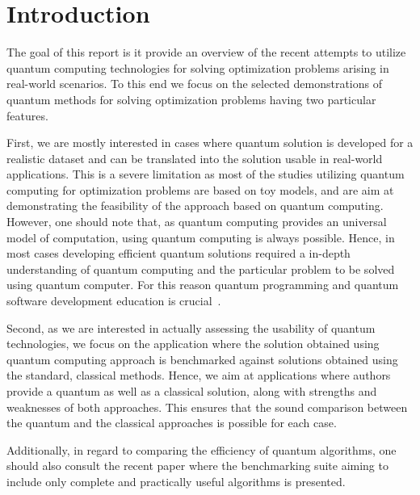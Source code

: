 \documentclass[a4paper,11pt]{article}
\newcommand{\docName}{report\xspace}
\begin{document}

%


\section{Introduction}

The goal of this \docName is it provide an overview of the recent attempts to utilize quantum computing technologies for solving optimization problems arising in real-world scenarios. To this end we focus on the selected demonstrations of quantum methods for solving optimization problems having two particular features.

First, we are mostly interested in cases where quantum solution is developed for a realistic dataset and can be translated into the solution usable in real-world applications. This is a severe limitation as most of the studies utilizing quantum computing for optimization problems are based on toy models, and are aim at demonstrating the feasibility of the approach based on quantum computing. However, one should note that, as quantum computing provides an universal model of computation, using quantum computing is always possible. Hence, in most cases developing efficient quantum solutions required a in-depth understanding of quantum computing and the particular problem to be solved using quantum computer. For this reason quantum programming and quantum software development education is crucial~\cite{salehi2022computer}.

Second, as we are interested in actually assessing the usability of quantum technologies, we focus on the application where the solution obtained using quantum computing approach is benchmarked against solutions obtained using the standard, classical methods. Hence, we aim at applications where authors provide a quantum as well as a classical solution, along with strengths and weaknesses of both approaches. This ensures that the sound comparison between the quantum and the classical approaches is possible for each case. 


Additionally, in regard to comparing the efficiency of quantum algorithms, one should also consult the recent paper \cite{lubinski2023application} where the benchmarking suite aiming to include only complete and practically useful algorithms is presented.
\end{document}
